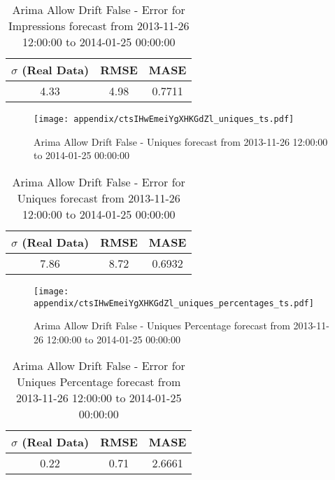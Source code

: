 \begin{table}[H]
\centering
\footnotesize
\begin{tabular}{ccc}
$\sigma$ (Real Data) & RMSE & MASE   \\ \hline
4.33 & 4.98 & 0.7711 \\
\end{tabular}

\vspace{0.5cm}

\caption{
Arima Allow Drift False - Error for Impressions forecast from 2013-11-26 12:00:00 to 2014-01-25 00:00:00}
\end{table}

\begin{figure}[H] \begin{center} \leavevmode
\texttt{[image: appendix/ctsIHwEmeiYgXHKGdZl\_uniques\_ts.pdf]} \caption{
Arima Allow Drift False - Uniques forecast from 2013-11-26 12:00:00 to 2014-01-25 00:00:00} \label{fig:appendix/ctsIHwEmeiYgXHKGdZl_uniques_ts.pdf} \end{center}
\end{figure}

\begin{table}[H]
\centering
\footnotesize
\begin{tabular}{ccc}
$\sigma$ (Real Data) & RMSE & MASE   \\ \hline
7.86 & 8.72 & 0.6932 \\
\end{tabular}

\vspace{0.5cm}

\caption{
Arima Allow Drift False - Error for Uniques forecast from 2013-11-26 12:00:00 to 2014-01-25 00:00:00}
\end{table}

\begin{figure}[H] \begin{center} \leavevmode
\texttt{[image: appendix/ctsIHwEmeiYgXHKGdZl\_uniques\_percentages\_ts.pdf]} \caption{
Arima Allow Drift False - Uniques Percentage forecast from 2013-11-26 12:00:00 to 2014-01-25 00:00:00} \label{fig:appendix/ctsIHwEmeiYgXHKGdZl_uniques_percentages_ts.pdf} \end{center}
\end{figure}

\begin{table}[H]
\centering
\footnotesize
\begin{tabular}{ccc}
$\sigma$ (Real Data) & RMSE & MASE   \\ \hline
0.22 & 0.71 & 2.6661 \\
\end{tabular}

\vspace{0.5cm}

\caption{
Arima Allow Drift False - Error for Uniques Percentage forecast from 2013-11-26 12:00:00 to 2014-01-25 00:00:00}
\end{table}

